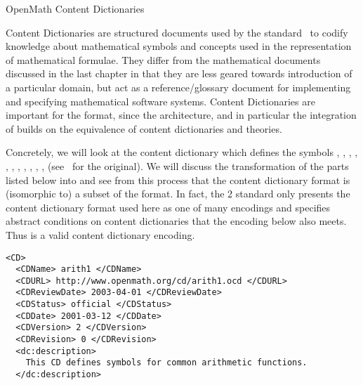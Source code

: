 
\begin{tchapter}[id=omcds]{OpenMath Content Dictionaries}

  Content Dictionaries are structured documents used by the {\openmath}
  standard~\cite{BusCapCar:2oms04} to codify knowledge about mathematical symbols and
  concepts used in the representation of mathematical formulae. They differ from the
  mathematical documents discussed in the last chapter in that they are less geared
  towards introduction of a particular domain, but act as a reference/glossary document
  for implementing and specifying mathematical software systems. Content Dictionaries are
  important for the {\omdoc} format, since the {\omdoc} architecture, and in particular
  the integration of {\openmath} builds on the equivalence of {\openmath} content
  dictionaries and {\omdoc} theories.

  Concretely, we will look at the content dictionary {} which defines
  the {\openmath} symbols {}, {}, {},
  {}, {}, {}, {},
  {}, {}, {}, {},
  {} (see~\cite{URL:omcd-core} for the original). We will discuss
  the transformation of the parts listed below into {\omdoc} and see from this process
  that the {\openmath} content dictionary format is (isomorphic to) a subset of the
  {\omdoc} format.  In fact, the {\openmath}2 standard only presents the content
  dictionary format used here as one of many encodings and specifies abstract conditions
  on content dictionaries that the {\omdoc} encoding below also meets. Thus {\omdoc} is a
  valid content dictionary encoding.

\begin{lstlisting}[language=omCD,label=lst:omcd,mathescape,
    caption={Part of the {\openmath} content dictionary {\snippet{arith1.ocd}}}]
<CD>
  <CDName> arith1 </CDName>
  <CDURL> http://www.openmath.org/cd/arith1.ocd </CDURL>
  <CDReviewDate> 2003-04-01 </CDReviewDate>
  <CDStatus> official </CDStatus>
  <CDDate> 2001-03-12 </CDDate>
  <CDVersion> 2 </CDVersion>
  <CDRevision> 0 </CDRevision>
  <dc:description> 
    This CD defines symbols for common arithmetic functions.
  </dc:description>


\end{lstlisting}
\end{tchapter}
